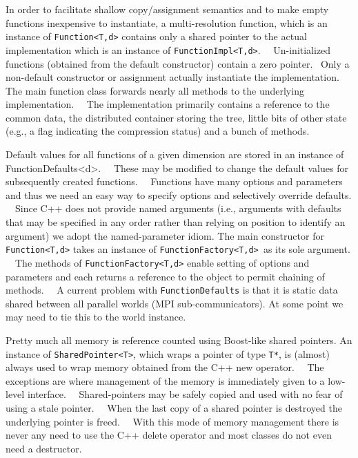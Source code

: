 \documentclass[letterpaper]{book}
\begin{document}
In order to facilitate shallow copy/assignment semantics and to make empty functions inexpensive to instantiate, a
multi-resolution function, which is an instance of \texttt{Function{\textless}T,d{\textgreater}} contains only a shared
pointer to the actual implementation which is an instance of \texttt{FunctionImpl{\textless}T,d{\textgreater}}.
\ \ Un-initialized functions (obtained from the default constructor) contain a zero pointer. \ Only a non-default
constructor or assignment actually instantiate the implementation. The main function class forwards nearly all methods
to the underlying implementation. \ \ The implementation primarily contains a reference to the common data, the
distributed container storing the tree, little bits of other state (e.g., a flag indicating the compression status) and
a bunch of methods.

Default values for all functions of a given dimension are stored in an instance of
FunctionDefaults{\textless}d{\textgreater}. \ \ These may be modified to change the default values for subsequently
created functions. \ \ Functions have many options and parameters and thus we need an easy way to specify options and
selectively override defaults. \ \ Since C++ does not provide named arguments (i.e., arguments with defaults that may
be specified in any order rather than relying on position to identify an argument) we adopt the named-parameter idiom.
The main constructor for \texttt{Function{\textless}T,d{\textgreater}} takes an instance of
\texttt{FunctionFactory{\textless}T,d{\textgreater} }as its sole argument. \ \ The methods of
\texttt{FunctionFactory{\textless}T,d{\textgreater}} enable setting of options and parameters and each returns a
reference to the object to permit chaining of methods. \ \ A current problem with \texttt{FunctionDefaults} is that it
is static data shared between all parallel worlds (MPI sub-communicators). At some point we may need to tie this to the
world instance.

Pretty much all memory is reference counted using Boost-like shared pointers. An instance of
\texttt{SharedPointer{\textless}T{\textgreater}}, which wraps a pointer of type \texttt{T*}, is (almost) always used to
wrap memory obtained from the C++ new operator. \ \ The exceptions are where management of the memory is immediately
given to a low-level interface. \ \ Shared-pointers may be safely copied and used with no fear of using a stale
pointer. \ \ When the last copy of a shared pointer is destroyed the underlying pointer is freed. \ \ With this mode of
memory management there is never any need to use the C++ delete operator and most classes do not even need a
destructor.
\end{document}
